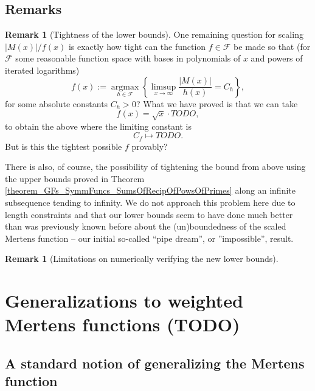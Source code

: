 \documentclass[11pt,reqno,a4letter]{article}
\numberwithin{figure}{section}
\numberwithin{table}{section}
\theoremstyle{plain}
\numberwithin{theorem}{section}
\theoremstyle{definition}
\newtheorem{remark}[theorem]{Remark}
\begin{document}
\subsection{Remarks} 

\begin{remark}[Tightness of the lower bounds] 
One remaining question for scaling $|M(x)| / f(x)$ is exactly how tight can the function 
$f \in \mathcal{F}$ be made so that 
(for $\mathcal{F}$ some reasonable function space with bases in polynomials of $x$ and 
powers of iterated logarithms) 
\[
f(x) := 
     \operatorname{argmax}\limits_{h \in \mathcal{F}} 
     \left\{\limsup_{x \rightarrow \infty} \frac{|M(x)|}{h(x)} = C_h \right\},  
\] 
for some absolute constants $C_h > 0$? 
What we have proved is that we can take 
\[
f(x) =  \sqrt{x} \cdot TODO, 
\]
to obtain the above where the limiting constant is 
$$C_f \mapsto TODO.$$ 
But is this the tightest possible $f$ provably? 

There is also, of course, 
the possibility of tightening the bound from above using the upper bounds proved in 
Theorem \ref{theorem_GFs_SymmFuncs_SumsOfRecipOfPowsOfPrimes} 
along an infinite subsequence tending to infinity. 
We do not approach this problem here 
due to length constraints and that our lower bounds seem to have done much better than was 
previously known before about the (un)boundedness of the scaled Mertens function -- our initial 
so-called ``pipe dream'', or ''impossible'', result.  
\end{remark} 

\begin{remark}[Limitations on numerically verifying the new lower bounds]
\end{remark} 

\newpage
\section{Generalizations to weighted Mertens functions (TODO)}
\label{Section_GensToWeightedMertensFuncs} 

\subsection{A standard notion of generalizing the Mertens function} 
\end{document}
